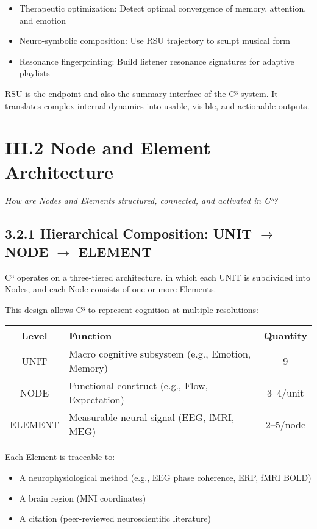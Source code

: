 \begin{itemize}
    \item Therapeutic optimization: Detect optimal convergence of memory, attention, and emotion
    \item Neuro-symbolic composition: Use RSU trajectory to sculpt musical form
    \item Resonance fingerprinting: Build listener resonance signatures for adaptive playlists
\end{itemize}

RSU is the endpoint and also the summary interface of the C³ system. It translates complex internal dynamics into usable, visible, and actionable outputs.

\section*{III.2 Node and Element Architecture}

\textit{How are Nodes and Elements structured, connected, and activated in C³?}

\subsection*{3.2.1 Hierarchical Composition: UNIT $\rightarrow$ NODE $\rightarrow$ ELEMENT}

C³ operates on a three-tiered architecture, in which each UNIT is subdivided into Nodes, and each Node consists of one or more Elements.

This design allows C³ to represent cognition at multiple resolutions:

\begin{center}
\begin{tabular}{|c|l|c|}
\hline
\textbf{Level} & \textbf{Function} & \textbf{Quantity} \\
\hline
UNIT & Macro cognitive subsystem (e.g., Emotion, Memory) & 9 \\
NODE & Functional construct (e.g., Flow, Expectation) & 3–4/unit \\
ELEMENT & Measurable neural signal (EEG, fMRI, MEG) & 2–5/node \\
\hline
\end{tabular}
\end{center}

Each Element is traceable to:

\begin{itemize}
    \item A neurophysiological method (e.g., EEG phase coherence, ERP, fMRI BOLD)
    \item A brain region (MNI coordinates)
    \item A citation (peer-reviewed neuroscientific literature)
\end{itemize}

